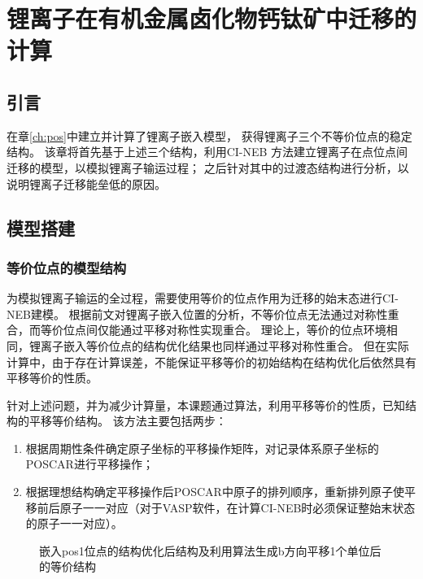 \chapter{锂离子在有机金属卤化物钙钛矿中迁移的计算}

\section{引言}

在章\ref{ch:pos}中建立并计算了锂离子嵌入模型，
获得锂离子三个不等价位点的稳定结构。
该章将首先基于上述三个结构，利用CI-NEB 方法建立锂离子在点位点间迁移的模型，以模拟锂离子输运过程；
之后针对其中的过渡态结构进行分析，以说明锂离子迁移能垒低的原因。

\section{模型搭建}

\subsection{等价位点的模型结构}

为模拟锂离子输运的全过程，需要使用等价的位点作用为迁移的始末态进行CI-NEB建模。
根据前文对锂离子嵌入位置的分析，不等价位点无法通过对称性重合，而等价位点间仅能通过平移对称性实现重合。
理论上，等价的位点环境相同，锂离子嵌入等价位点的结构优化结果也同样通过平移对称性重合。
但在实际计算中，由于存在计算误差，不能保证平移等价的初始结构在结构优化后依然具有平移等价的性质。

针对上述问题，并为减少计算量，本课题通过算法，利用平移等价的性质，已知结构的平移等价结构。
该方法主要包括两步：
\begin{enumerate}
    \item 根据周期性条件确定原子坐标的平移操作矩阵，对记录体系原子坐标的POSCAR进行平移操作；
    \item 根据理想结构确定平移操作后POSCAR中原子的排列顺序，重新排列原子使平移前后原子一一对应（对于VASP软件，在计算CI-NEB时必须保证整始末状态的原子一一对应）。
\end{enumerate}

\begin{figure}[htbp]
    \centering
    \caption{嵌入pos1位点的结构优化后结构及利用算法生成b方向平移1个单位后的等价结构}
    \label{fig:111-pos1-eq}
\end{figure}


